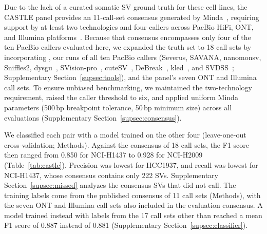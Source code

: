Due to the lack of a curated somatic SV ground truth for these cell lines, the CASTLE panel provides an 11-call-set consensus generated by Minda~\cite{minda}, requiring support by at least two technologies and four callers across PacBio HiFi, ONT, and Illumina platforms~\cite{severus,savana,nanomonsv,sniffles2,svaba,gripss,manta}. Because that consensus encompasses only four of the ten PacBio callers evaluated here, we expanded the truth set to 18 call sets by incorporating \tool{}, our runs of all ten PacBio callers (Severus, SAVANA, nanomonsv, Sniffles2, dysgu~\cite{dysgu}, SVision-pro~\cite{svisionpro}, cuteSV~\cite{cutesv}, DeBreak~\cite{debreak}, kled~\cite{kled}, and SVDSS~\cite{svdss}; Supplementary Section~\ref{supsec:tools}), and the panel's seven ONT and Illumina call sets. To ensure unbiased benchmarking, we maintained the two-technology requirement, raised the caller threshold to six, and applied uniform Minda parameters (500\,bp breakpoint tolerance, 50\,bp minimum size) across all evaluations (Supplementary Section~\ref{supsec:consensus}).

We classified each pair with a model trained on the other four (leave-one-out cross-validation; Methods).
Against the consensus of 18 call sets, the F1 score then ranged from 0.850 for NCI-H1437 to 0.928 for NCI-H2009 (Table~\ref{tab:castle}).
Precision was lowest for HCC1937, and recall was lowest for NCI-H1437, whose consensus contains only 222 SVs.
Supplementary Section~\ref{supsec:missed} analyzes the consensus SVs that \tool{} did not call.
The training labels come from the published consensus of 11 call sets (Methods), with the seven ONT and Illumina call sets also included in the evaluation consensus.
A model trained instead with labels from the 17 call sets other than \tool{} reached a mean F1 score of 0.887 instead of 0.881 (Supplementary Section~\ref{supsec:classifier}).


